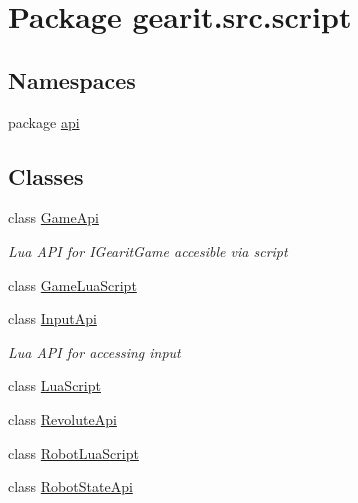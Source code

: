 \hypertarget{namespacegearit_1_1src_1_1script}{\section{Package gearit.\+src.\+script}
\label{namespacegearit_1_1src_1_1script}
}
\subsection*{Namespaces}
\begin{DoxyCompactItemize}
\item 
package \hyperlink{namespacegearit_1_1src_1_1script_1_1api}{api}
\end{DoxyCompactItemize}
\subsection*{Classes}
\begin{DoxyCompactItemize}
\item 
class \hyperlink{classgearit_1_1src_1_1script_1_1_game_api}{Game\+Api}
\begin{DoxyCompactList}\small\item\em Lua A\+P\+I for I\+Gearit\+Game accesible via script \end{DoxyCompactList}\item 
class \hyperlink{classgearit_1_1src_1_1script_1_1_game_lua_script}{Game\+Lua\+Script}
\item 
class \hyperlink{classgearit_1_1src_1_1script_1_1_input_api}{Input\+Api}
\begin{DoxyCompactList}\small\item\em Lua A\+P\+I for accessing input \end{DoxyCompactList}\item 
class \hyperlink{classgearit_1_1src_1_1script_1_1_lua_script}{Lua\+Script}
\item 
class \hyperlink{classgearit_1_1src_1_1script_1_1_revolute_api}{Revolute\+Api}
\item 
class \hyperlink{classgearit_1_1src_1_1script_1_1_robot_lua_script}{Robot\+Lua\+Script}
\item 
class \hyperlink{classgearit_1_1src_1_1script_1_1_robot_state_api}{Robot\+State\+Api}
\end{DoxyCompactItemize}
